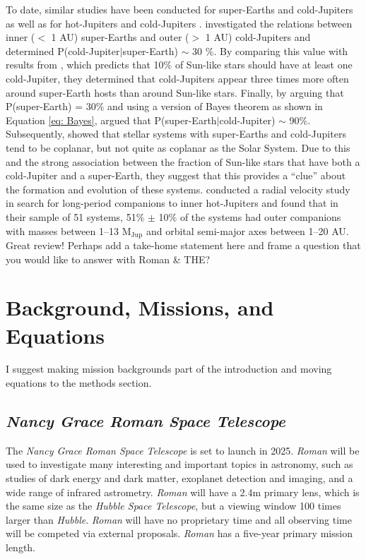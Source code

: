 \documentclass[twocolumn]{aastex631}
\newcommand{\racomment}[1]{{\color{blue}#1}}
\begin{document}
To date, similar studies have been conducted for super-Earths and cold-Jupiters \citep{Zu2018, Masuda2020} as well as for hot-Jupiters and cold-Jupiters \citep{Knutson2014}. \citet{Zu2018} investigated the relations between inner ($<$ 1 AU) super-Earths and outer ($>$ 1 AU) cold-Jupiters and determined P(\textrm{cold-Jupiter}$|$\textrm{super-Earth}) $\sim$ 30 $\%$. By comparing this value with results from \citet{Cumming2008}, which predicts that 10$\%$ of Sun-like stars should have at least one cold-Jupiter, they determined that cold-Jupiters appear three times more often around super-Earth hosts than around Sun-like stars. Finally, by arguing that P(\textrm{super-Earth}) = 30$\%$ and using a version of Bayes theorem as shown in Equation \ref{eq: Bayes}, \citet{Zu2018} argued that P(\textrm{super-Earth}$|$\textrm{cold-Jupiter}) $\sim$ 90$\%$. Subsequently, \citet{Masuda2020} showed that stellar systems with super-Earths and cold-Jupiters tend to be coplanar, but not quite as coplanar as the Solar System. Due to this and the strong association between the fraction of Sun-like stars that have both a cold-Jupiter and a super-Earth, they suggest that this provides a ``clue'' about the formation and evolution of these systems. \citet{Knutson2014} conducted a radial velocity study in search for long-period companions to inner hot-Jupiters and found that in their sample of 51 systems, 51$\%$ $\pm$ 10$\%$ of the systems had outer companions with masses between 1–13 M$_{\textrm{Jup}}$ and orbital semi-major axes between 1–20 AU.
\racomment{Great review! Perhaps add a take-home statement here and frame a question that you would like to answer with Roman \& THE?}

\section{Background, Missions, and Equations}

\racomment{I suggest making mission backgrounds part of the introduction and moving equations to the methods section.}

\subsection{\textit{Nancy Grace Roman Space Telescope}}

The \textit{Nancy Grace Roman Space Telescope} is set to launch in 2025. \textit{Roman} will be used to investigate many interesting and important topics in astronomy, such as studies of dark energy and dark matter, exoplanet detection and imaging, and a wide range of infrared astrometry. \textit{Roman} will have a 2.4m primary lens, which is the same size as the \textit{Hubble Space Telescope}, but a viewing window 100 times larger than \textit{Hubble}. \textit{Roman} will have no proprietary time and all observing time will be competed via external proposals. \textit{Roman} has a five-year primary mission length.
\end{document}
